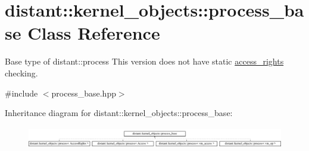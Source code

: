 \hypertarget{classdistant_1_1kernel__objects_1_1process__base}{}\section{distant\+:\+:kernel\+\_\+objects\+:\+:process\+\_\+base Class Reference}
\label{classdistant_1_1kernel__objects_1_1process__base}


Base type of distant\+::process This version does not have static \mbox{\hyperlink{structdistant_1_1access__rights}{access\+\_\+rights}} checking.  




{\ttfamily \#include $<$process\+\_\+base.\+hpp$>$}

Inheritance diagram for distant\+:\+:kernel\+\_\+objects\+:\+:process\+\_\+base\+:\begin{figure}[H]
\begin{center}
\leavevmode
\includegraphics[height=0.949153cm]{classdistant_1_1kernel__objects_1_1process__base}
\end{center}
\end{figure}
